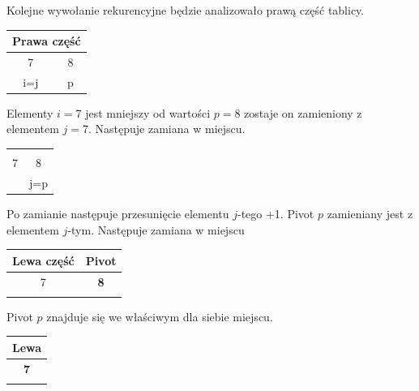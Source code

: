\documentclass[a4paper,11pt]{report}
\begin{document}
Kolejne wywołanie rekurencyjne będzie analizowało prawą część tablicy.


\begin{table}[h!]
\Large
\centering
\begin{tabular}{|c|c|}
\hline
\multicolumn{2}{|c|}{Prawa część} \\ \hline
\cellcolor{black!25}7 & 8 \\ \hdashline
i=j & p \\ \hline
\end{tabular}

\end{table}

Elementy $i=$7 jest mniejszy od wartości $p=$8 zostaje on zamieniony z elementem $j=$7. Następuje zamiana w miejscu.


\begin{table}[h!]
\Large
\centering
\begin{tabular}{|c|c|}
\hline
 &  \cellcolor{black!25}\\ 
7 & \cellcolor{black!25}8 \\ \hdashline
 & j=p \\ \hline
\end{tabular}

\end{table}
Po zamianie następuje przesunięcie elementu $j$-tego +1. Pivot $p$ zamieniany jest z elementem $j$-tym. Następuje zamiana w miejscu

\begin{table}[h!]
\Large
\centering
\begin{tabular}{|c|c|}
\hline
 Lewa część & Pivot \\ \hline
7 &  \textbf{8}\\ \hdashline
 &  \\ \hline
\end{tabular}

\end{table}

Pivot $p$ znajduje się we właściwym dla siebie miejscu. 

\begin{table}[h!]
\Large
\centering
\begin{tabular}{|c|}
\hline
Lewa \\ \hline
\textbf{7} \\ \hdashline
 \\ \hline
\end{tabular}

\end{table}
\end{document}
